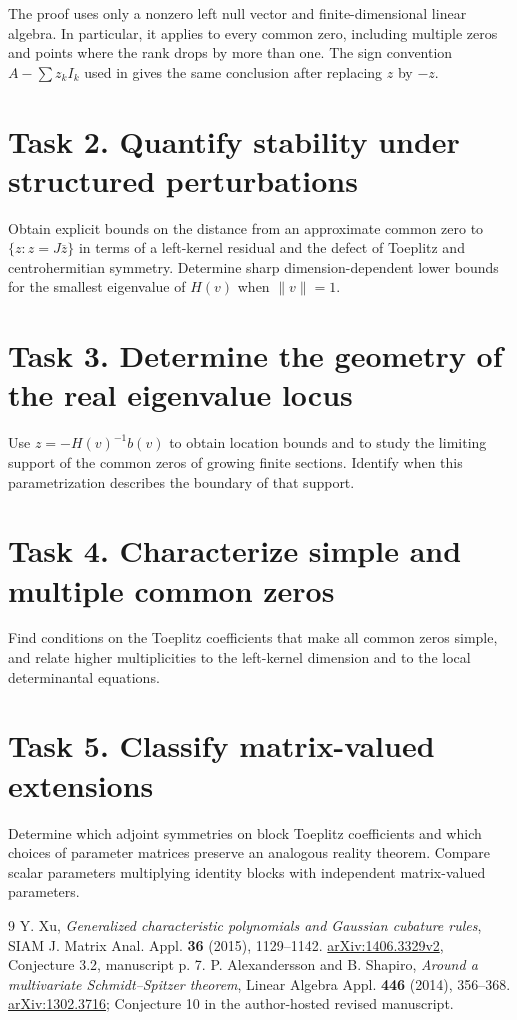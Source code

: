 \documentclass[11pt]{article}
\begin{document}
The proof uses only a nonzero left null vector and finite-dimensional
linear algebra. In particular, it applies to every common zero, including
multiple zeros and points where the rank drops by more than one.
The sign convention $A-\sum z_kI_k$ used in \cite{AS} gives the same
conclusion after replacing $z$ by $-z$.

\section*{Task 2. Quantify stability under structured perturbations}
Obtain explicit bounds on the distance from an approximate common zero
to $\{z:z=J\overline z\}$ in terms of a left-kernel residual and the
defect of Toeplitz and centrohermitian symmetry. Determine sharp
dimension-dependent lower bounds for the smallest eigenvalue of
$H(v)$ when $\|v\|=1$.

\section*{Task 3. Determine the geometry of the real eigenvalue locus}
Use $z=-H(v)^{-1}b(v)$ to obtain location bounds and to study the
limiting support of the common zeros of growing finite sections.
Identify when this parametrization describes the boundary of that support.

\section*{Task 4. Characterize simple and multiple common zeros}
Find conditions on the Toeplitz coefficients that make all common zeros
simple, and relate higher multiplicities to the left-kernel dimension
and to the local determinantal equations.

\section*{Task 5. Classify matrix-valued extensions}
Determine which adjoint symmetries on block Toeplitz coefficients and
which choices of parameter matrices preserve an analogous reality
theorem. Compare scalar parameters multiplying identity blocks with
independent matrix-valued parameters.

\begin{thebibliography}{9}
 Y. Xu, \emph{Generalized characteristic polynomials and
Gaussian cubature rules}, SIAM J. Matrix Anal. Appl. \textbf{36} (2015),
1129--1142. \href{https://arxiv.org/abs/1406.3329}{arXiv:1406.3329v2},
Conjecture 3.2, manuscript p. 7.
 P. Alexandersson and B. Shapiro,
\emph{Around a multivariate Schmidt--Spitzer theorem},
Linear Algebra Appl. \textbf{446} (2014), 356--368.
\href{https://arxiv.org/abs/1302.3716}{arXiv:1302.3716};
Conjecture 10 in the author-hosted revised manuscript.
\end{thebibliography}
\end{document}
